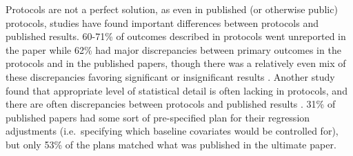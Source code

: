 \documentclass[12pt] {article}
\begin{document}
Protocols are not a perfect solution, as even in published (or otherwise public) protocols, studies have found important differences between protocols and published results. 60-71\%
of outcomes described in protocols went unreported in the paper while
62\% had major discrepancies between primary outcomes in the protocols
and in the published papers, though there was a relatively even mix of
these discrepancies favoring significant or insignificant results \citep{chan_a_empirical_2004}. Another study found that appropriate level of statistical detail is often lacking in protocols, and there are often discrepancies between protocols and published results \citep{saquib_practices_2013}. 31\% of published papers had some sort of pre-specified plan for their regression adjustments (i.e.~specifying which baseline covariates would be controlled for), %
but only 53\% of the plans matched what was published in the ultimate paper.
\end{document}

